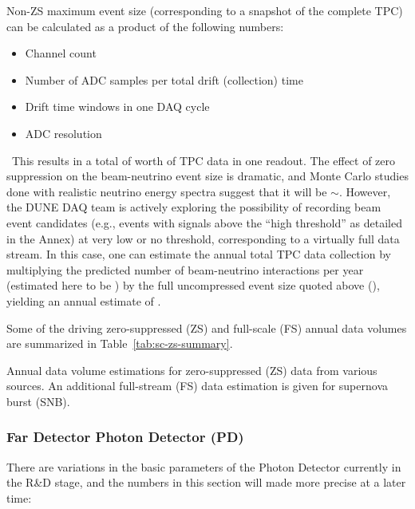 Non-ZS maximum event size (corresponding to a snapshot of the complete TPC) can be calculated as a product of the following numbers:
\begin{itemize}
\item Channel count
\item Number of ADC samples per total drift (collection) time
\item Drift time windows in one DAQ cycle
\item ADC resolution
\end{itemize}
\
This results in a total of \dunefsreadoutsize worth of TPC data in one
readout.
The effect of zero suppression on
the beam-neutrino event size is dramatic, and Monte Carlo studies done with realistic neutrino
energy spectra suggest that it will be $\sim$\beameventsize.
However, %
the DUNE DAQ team is actively exploring the possibility of
recording beam event candidates (e.g., events with signals
above the ``high threshold'' as detailed in the Annex) at very low or no threshold, corresponding
to a virtually full data stream.
In this case, one can estimate the annual total %
TPC data collection
by multiplying the predicted number of beam-neutrino interactions
per year (estimated here to be \beamrate) by the full uncompressed event size quoted above (\dunefsreadoutsize), yielding
an annual estimate of \beamdatayearfs. %

Some of the driving zero-suppressed (ZS) and full-scale (FS) annual
data volumes are summarized in Table~\ref{tab:sc-zs-summary}.
\begin{table}[htbp]
  \centering
  \caption{Annual data volume estimations for zero-suppressed (ZS) data from various sources.
  An additional full-stream (FS) data estimation is given for supernova burst (SNB).}
  
  \label{tab:sc-zs-summary}
\end{table}

\subsubsection{Far Detector Photon Detector (PD)}
There are variations in the basic parameters of the Photon Detector currently in the R\&D stage, %
and the numbers in this section %
will made more precise
at a later time:

